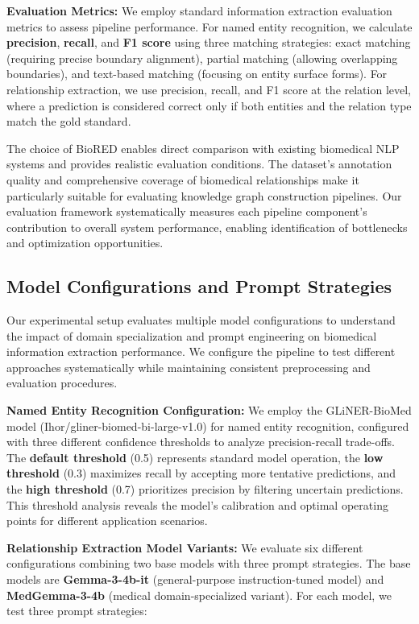 \textbf{Evaluation Metrics:} We employ standard information extraction evaluation metrics to assess pipeline performance. For named entity recognition, we calculate \textbf{precision}, \textbf{recall}, and \textbf{F1 score} using three matching strategies: exact matching (requiring precise boundary alignment), partial matching (allowing overlapping boundaries), and text-based matching (focusing on entity surface forms). For relationship extraction, we use precision, recall, and F1 score at the relation level, where a prediction is considered correct only if both entities and the relation type match the gold standard.

The choice of BioRED enables direct comparison with existing biomedical NLP systems and provides realistic evaluation conditions. The dataset's annotation quality and comprehensive coverage of biomedical relationships make it particularly suitable for evaluating knowledge graph construction pipelines. Our evaluation framework systematically measures each pipeline component's contribution to overall system performance, enabling identification of bottlenecks and optimization opportunities.

\subsection{Model Configurations and Prompt Strategies}

Our experimental setup evaluates multiple model configurations to understand the impact of domain specialization and prompt engineering on biomedical information extraction performance. We configure the pipeline to test different approaches systematically while maintaining consistent preprocessing and evaluation procedures.

\textbf{Named Entity Recognition Configuration:} We employ the GLiNER-BioMed model (Ihor/gliner-biomed-bi-large-v1.0) for named entity recognition, configured with three different confidence thresholds to analyze precision-recall trade-offs. The \textbf{default threshold} (0.5) represents standard model operation, the \textbf{low threshold} (0.3) maximizes recall by accepting more tentative predictions, and the \textbf{high threshold} (0.7) prioritizes precision by filtering uncertain predictions. This threshold analysis reveals the model's calibration and optimal operating points for different application scenarios.

\textbf{Relationship Extraction Model Variants:} We evaluate six different configurations combining two base models with three prompt strategies. The base models are \textbf{Gemma-3-4b-it} (general-purpose instruction-tuned model) and \textbf{MedGemma-3-4b} (medical domain-specialized variant). For each model, we test three prompt strategies:

